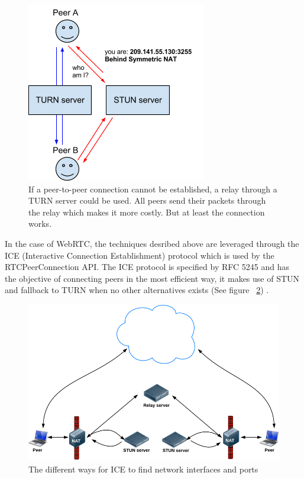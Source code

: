 \begin{figure}[htp]
\centering
\includegraphics[width=\textwidth,height=0.2\paperheight,keepaspectratio
]{figures/webrtc-turn}
\caption{If a peer-to-peer connection cannot be established, a relay through a TURN server could be used. All peers send their packets through the relay which makes it more costly. But at least the connection works\cite{WebRTCArchitecture:2014:Online}.}
\label{fig:WebRTC - TURN}
\end{figure}

In the case of WebRTC, the techniques desribed above are leveraged through the ICE (Interactive Connection Establishment) protocol which is used by the RTCPeerConnection API. The ICE protocol is specified by RFC 5245 and has the objective of connecting peers in the most efficient way, it makes use of STUN and fallback to TURN when no other alternatives exists (See figure ~\ref{fig:ICE}) \cite{RFC5245:Online}.

\begin{figure}[htp]
\centering
\includegraphics[width=\textwidth,height=0.25\paperheight,keepaspectratio
]{figures/ICE}
\caption{The different ways for ICE to find network interfaces and ports \cite{WebRTCBasics:2012:Online}}
\label{fig:ICE}
\end{figure}

